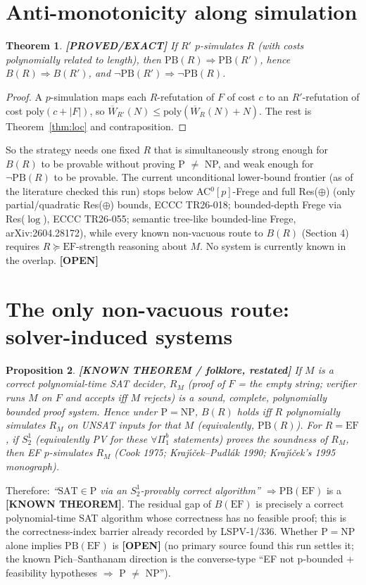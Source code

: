 \documentclass[11pt]{article}
\newtheorem{theorem}{Theorem}
\newtheorem{proposition}[theorem]{Proposition}
\theoremstyle{definition}
\theoremstyle{remark}
\newcommand{\SAT}{\mathrm{SAT}}
\newcommand{\Wb}{\overline W}
\newcommand{\PB}{\mathrm{PB}}
\newcommand{\status}[1]{\textbf{[#1]}}
\begin{document}
\section{Anti-monotonicity along simulation}
\begin{theorem}\label{thm:anti}\status{PROVED/EXACT}
If $R'$ $p$-simulates $R$ (with costs polynomially related to length), then $\PB(R)\Rightarrow\PB(R')$, hence
$B(R)\Rightarrow B(R')$, and $\neg\PB(R')\Rightarrow\neg\PB(R)$.
\end{theorem}
\begin{proof}A $p$-simulation maps each $R$-refutation of $F$ of cost $c$ to an $R'$-refutation of cost $\mathrm{poly}(c+|F|)$,
so $\Wb_{R'}(N)\le\mathrm{poly}(\Wb_R(N)+N)$. The rest is Theorem~\ref{thm:loc} and contraposition.\end{proof}

\noindent So the strategy needs one fixed $R$ that is simultaneously strong enough for $B(R)$ to be provable without proving
P $\ne$ NP, and weak enough for $\neg\PB(R)$ to be provable. The current unconditional lower-bound frontier
(as of the literature checked this run) stops below AC$^0[p]$-Frege and full Res($\oplus$) (only partial/quadratic Res($\oplus$)
bounds, ECCC TR26-018; bounded-depth Frege via Res($\log$), ECCC TR26-055; semantic tree-like bounded-line Frege,
arXiv:2604.28172), while every known non-vacuous route to $B(R)$ (Section 4) requires $R\succeq\mathrm{EF}$-strength
reasoning about $M$. No system is currently known in the overlap. \status{OPEN}

\section{The only non-vacuous route: solver-induced systems}
\begin{proposition}\status{KNOWN THEOREM / folklore, restated}
If $M$ is a correct polynomial-time SAT decider, $R_M$ (proof of $F$ = the empty string; verifier runs $M$ on $F$ and accepts iff $M$ rejects)
is a sound, complete, polynomially bounded proof system. Hence under $\mathrm P=\mathrm{NP}$, $B(R)$ holds iff
$R$ polynomially simulates $R_M$ on UNSAT inputs for that $M$ (equivalently, $\PB(R)$).
For $R=\mathrm{EF}$, if $S^1_2$ (equivalently PV for these $\forall\Pi^b_1$ statements) proves the soundness of $R_M$, then EF $p$-simulates $R_M$
(Cook 1975; Kraj\'{\i}\v{c}ek--Pudl\'ak 1990; Kraj\'{\i}\v{c}ek's 1995 monograph).
\end{proposition}
Therefore: \emph{``$\SAT\in\mathrm P$ via an $S^1_2$-provably correct algorithm'' $\Rightarrow \PB(\mathrm{EF})$} is a
\status{KNOWN THEOREM}. The residual gap of $B(\mathrm{EF})$ is precisely a correct polynomial-time SAT algorithm whose
correctness has no feasible proof; this is the correctness-index barrier already recorded by LSPV-1/336. Whether
$\mathrm P=\mathrm{NP}$ alone implies $\PB(\mathrm{EF})$ is \status{OPEN} (no primary source found this run settles it; the known
Pich--Santhanam direction is the converse-type ``EF not p-bounded + feasibility hypotheses $\Rightarrow$ P $\ne$ NP'').
\end{document}

